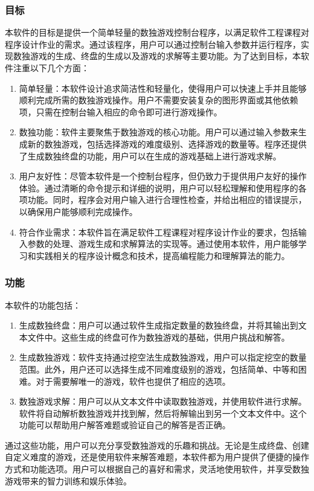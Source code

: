 \documentclass[a4paper]{article}
\begin{document}
\subsubsection{目标}
本软件的目标是提供一个简单轻量的数独游戏控制台程序，以满足软件工程课程对程序设计作业的需求。通过该程序，用户可以通过控制台输入参数并运行程序，实现数独游戏的生成、终盘的生成以及游戏的求解等主要功能。为了达到目标，本软件注重以下几个方面：
\begin{enumerate}
\item 简单轻量：本软件设计追求简洁性和轻量化，使得用户可以快速上手并且能够顺利完成所需的数独游戏操作。用户不需要安装复杂的图形界面或其他依赖项，只需在控制台输入相应的命令即可进行游戏操作。
\item 数独功能：软件主要聚焦于数独游戏的核心功能。用户可以通过输入参数来生成新的数独游戏，包括选择游戏的难度级别、选择游戏的数量等。程序还提供了生成数独终盘的功能，用户可以在生成的游戏基础上进行游戏求解。
\item 用户友好性：尽管本软件是一个控制台程序，但仍致力于提供用户友好的操作体验。通过清晰的命令提示和详细的说明，用户可以轻松理解和使用程序的各项功能。同时，程序会对用户输入进行合理性检查，并给出相应的错误提示，以确保用户能够顺利完成操作。
\item 符合作业需求：本软件旨在满足软件工程课程对程序设计作业的要求，包括输入参数的处理、游戏生成和求解算法的实现等。通过使用本软件，用户能够学习和实践相关的程序设计概念和技术，提高编程能力和理解算法的能力。

\end{enumerate}

\subsubsection{功能}
本软件的功能包括：
\begin{enumerate}
\item 生成数独终盘：用户可以通过软件生成指定数量的数独终盘，并将其输出到文本文件中。这些生成的终盘可作为数独游戏的基础，供用户挑战和解答。
\item 生成数独游戏：软件支持通过挖空法生成数独游戏，用户可以指定挖空的数量范围。此外，用户还可以选择生成不同难度级别的游戏，包括简单、中等和困难。对于需要解唯一的游戏，软件也提供了相应的选项。
\item 数独游戏求解：用户可以从文本文件中读取数独游戏，并使用软件进行求解。软件将自动解析数独游戏并找到解，然后将解输出到另一个文本文件中。这个功能可以帮助用户解答难题或验证自己的解答是否正确。
\end{enumerate}
通过这些功能，用户可以充分享受数独游戏的乐趣和挑战。无论是生成终盘、创建自定义难度的游戏，还是使用软件来解答难题，本软件都为用户提供了便捷的操作方式和功能选项。用户可以根据自己的喜好和需求，灵活地使用软件，并享受数独游戏带来的智力训练和娱乐体验。
\end{document}
